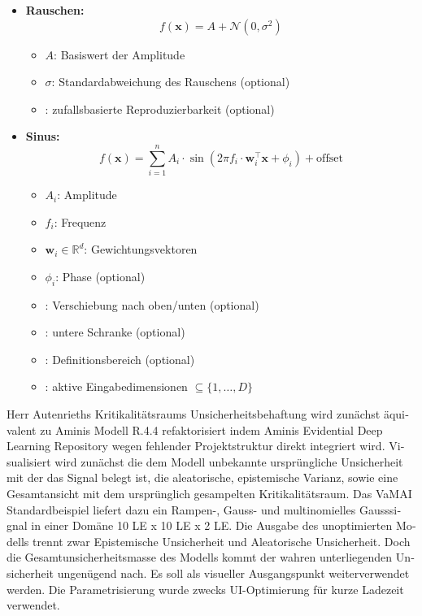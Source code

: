 \begin{otherlanguage}{ngerman}
\begin{itemize}
  \item \textbf{Rauschen:}
    \[
    f(\mathbf{x}) = A + \mathcal{N}(0, \sigma^2)
    \]
    \begin{itemize}
      \item $A$: Basiswert der Amplitude
      \item $\sigma$: Standardabweichung des Rauschens (optional)
      \item {}: zufallsbasierte Reproduzierbarkeit (optional)
    \end{itemize}

  \item \textbf{Sinus:}
    \[
    f(\mathbf{x}) = \sum_{i=1}^{n} A_i \cdot \sin(2\pi f_i \cdot \mathbf{w}_i^\top \mathbf{x} + \phi_i) + \text{offset}
    \]
    \begin{itemize}
      \item $A_i$: Amplitude
      \item $f_i$: Frequenz
      \item $\mathbf{w}_i \in \mathbb{R}^d$: Gewichtungsvektoren
      \item $\phi_i$: Phase (optional)
      \item {}: Verschiebung nach oben/unten (optional)
      \item {}: untere Schranke (optional)
      \item {}: Definitionsbereich (optional)
      \item {}: aktive Eingabedimensionen $\subseteq \{1, \dots, D\}$
    \end{itemize}
\end{itemize}



Herr Autenrieths Kritikalitätsraums Unsicherheitsbehaftung wird zunächst äquivalent zu Aminis Modell R.4.4 refaktorisiert indem Aminis \glqq{}Evidential Deep Learning\grqq{} Repository wegen fehlender Projektstruktur direkt integriert wird. Visualisiert wird zunächst die dem Modell unbekannte ursprüngliche Unsicherheit mit der das Signal belegt ist, die aleatorische, epistemische Varianz, sowie eine Gesamtansicht mit dem ursprünglich gesampelten Kritikalitätsraum. Das VaMAI Standardbeispiel liefert dazu ein Rampen-, Gauss- und multinomielles Gausssignal in einer Domäne 10 LE x 10 LE x 2 LE. Die Ausgabe des unoptimierten Modells trennt zwar \gls{Epistemische Unsicherheit} und \gls{Aleatorische Unsicherheit}. Doch die Gesamtunsicherheitsmasse des Modells kommt der wahren unterliegenden Unsicherheit ungenügend nach. Es soll als visueller Ausgangspunkt weiterverwendet werden. Die Parametrisierung wurde zwecks UI-Optimierung für kurze Ladezeit verwendet.




\end{otherlanguage}
